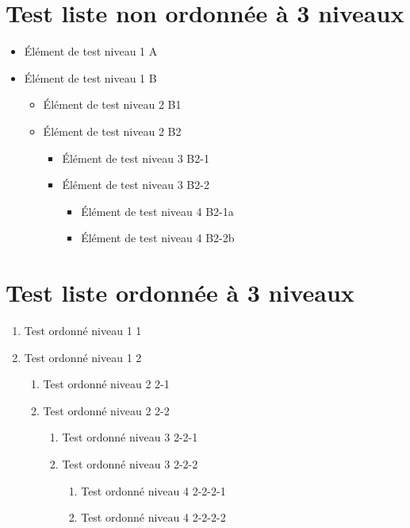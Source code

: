 \documentclass[fr]{../../elegantbook}
\begin{document}
\section{Test liste non ordonnée à 3 niveaux}
\begin{itemize}
\item Élément de test niveau 1 A
\item Élément de test niveau 1 B
    \begin{itemize}
    \item Élément de test niveau 2 B1
    \item Élément de test niveau 2 B2
        \begin{itemize}
        \item Élément de test niveau 3 B2-1
        \item Élément de test niveau 3 B2-2
            \begin{itemize}
            \item Élément de test niveau 4 B2-1a
            \item Élément de test niveau 4 B2-2b
            \end{itemize}
        \end{itemize}
    \end{itemize}
\end{itemize}

\section{Test liste ordonnée à 3 niveaux}
\begin{enumerate}
\item Test ordonné niveau 1 1
\item Test ordonné niveau 1 2
    \begin{enumerate}
    \item Test ordonné niveau 2 2-1
    \item Test ordonné niveau 2 2-2
        \begin{enumerate}
        \item Test ordonné niveau 3 2-2-1
        \item Test ordonné niveau 3 2-2-2
            \begin{enumerate}
            \item Test ordonné niveau 4 2-2-2-1
            \item Test ordonné niveau 4 2-2-2-2
            \end{enumerate}
        \end{enumerate}
    \end{enumerate}
\end{enumerate}
\end{document}
